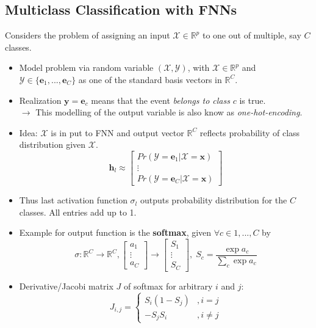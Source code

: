 \documentclass[english]{latex4ei/latex4ei_sheet}
\begin{document}
\begin{sectionbox}
\subsection{Multiclass Classification with FNNs}
Considers the problem of assigning an input $\mathcal{X}\in\mathbb{R}^p$ to one out of multiple, say $C$ classes.
\begin{itemize}
    \item Model problem via random variable $(\mathcal{X,Y})$, with $\mathcal{X}\in\mathbb{R}^p$ and $\mathcal{Y}\in\{\mathbf{e}_1,...,\mathbf{e}_C\}$ as one of the standard basis vectors in $\mathbb{R}^C$.
    \item Realization $\mathbf{y}=\mathbf{e}_c$ means that the event \emph{belongs to class} $c$ is true.\\
    $\rightarrow$ This modelling of the output variable is also know as \emph{one-hot-encoding}.
    \item Idea: $\mathcal{X}$ is in put to FNN and output vector $\mathbb{R}^C$ reflects probability of class distribution given $\mathcal{X}$.
    \[
    \mathbf{h}_l\approx
    \begin{bmatrix}
    Pr(\mathcal{Y}=\mathbf{e}_1|\mathcal{X}=\mathbf{x})\\
    \vdots\\
    Pr(\mathcal{Y}=\mathbf{e}_C|\mathcal{X}=\mathbf{x})
    \end{bmatrix}
    \]
    \item Thus last activation function $\sigma_l$ outputs probability distribution for the $C$ classes. All entries add up to 1.
    \item Example for output function is the \textbf{softmax}, given $\forall c\in1,...,C$ by
    \[
    \sigma:\mathbb{R}^C \to \mathbb{R}^C,
    \begin{bmatrix}
    a_1\\ \vdots\\ a_C
    \end{bmatrix}
    \to
    \begin{bmatrix}
    S_1\\ \vdots\\ S_C
    \end{bmatrix},\; S_c=\frac{\exp a_c}{\sum_c\exp a_c}
    \]
    \item Derivative/Jacobi matrix $J$ of softmax for arbitrary $i$ and $j$:
    \[
    J_{i,j} = \begin{cases}
        S_i(1-S_j) & ,i=j\\
        -S_j S_i & ,i\ne j
        \end{cases}
    \]
\end{itemize}
\end{sectionbox}
\end{document}
